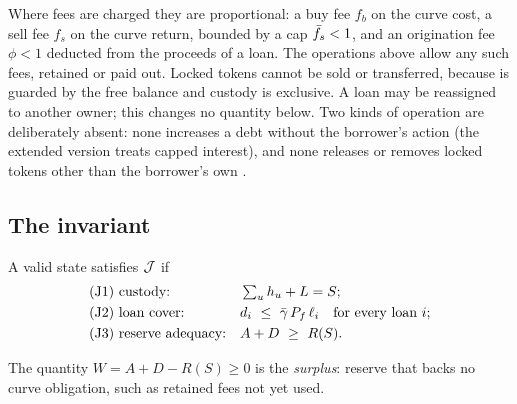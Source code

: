 Where fees are charged they are proportional: a buy fee $f_b$ on the curve cost, a sell fee $f_s$ on the curve return, bounded by a cap $\bar f_s<1$, and an origination fee $\phi<1$ deducted from the proceeds of a loan. The operations above allow any such fees, retained or paid out. Locked tokens cannot be sold or transferred, because  is guarded by the free balance and custody is exclusive. A loan may be reassigned to another owner; this changes no quantity below. Two kinds of operation are deliberately absent: none increases a debt without the borrower's action (the extended version treats capped interest), and none releases or removes locked tokens other than the borrower's own .

\subsection{The invariant}

\begin{definition}\label{def:J}
A valid state satisfies $\mathcal{J}$ if
\begin{align}
&\text{(J1) custody:} && \textstyle\sum_u h_u+L=S; \\
&\text{(J2) loan cover:} && d_i\ \le\ \gbar\,\Pf\,\ell_i\quad\text{for every loan } i;\label{eq:J2}\\
&\text{(J3) reserve adequacy:} && A+D\ \ge\ R(S).\label{eq:J3}
\end{align}
\end{definition}

The quantity $W=A+D-R(S)\ge 0$ is the \emph{surplus}: reserve that backs no curve obligation, such as retained fees not yet used.

